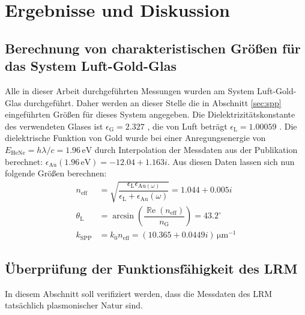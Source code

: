 \documentclass[a4paper, titlepage,  ngerman]{book}
\renewcommand{\Re}{\operatorname{\mathbb{R}e}}
\begin{document}
	\chapter{Ergebnisse und Diskussion}
	\section{Berechnung von charakteristischen Größen für das System Luft-Gold-Glas}
		Alle in dieser Arbeit durchgeführten Messungen wurden am System Luft-Gold-Glas durchgeführt. Daher werden an dieser Stelle die in Abschnitt \ref{sec:spp} eingeführten Größen für dieses System angegeben. Die Dielektrizitätskonstante des verwendeten Glases ist $\epsilon_{\mathrm{G}} = 2.327$ \cite{Zeiss.}, die von Luft beträgt $\epsilon_{\mathrm{L}} = 1.00059$ \cite{Hippel.1995}. Die dielektrische Funktion von Gold wurde bei einer Anregungsenergie von $E_{\mathrm{HeNe}} = h\lambda/c = 1.96\,\mathrm{eV} $ durch Interpolation der Messdaten aus der Publikation \cite{Olmon.2012} berechnet: $\epsilon_{\mathrm{Au}}(1.96\,\mathrm{eV}) = -12.04 +1.163i$. Aus diesen Daten lassen sich nun folgende Größen berechnen:
		\begin{subequations}
			\begin{align}
				n_{\mathrm{eff}} &= \sqrt{\dfrac{\epsilon_{\mathrm{L}}\epsilon_{\mathrm{Au}(\omega)}}{\epsilon_{\mathrm{L}} + 	\epsilon_{\mathrm{Au}}(\omega)}} = 	1.044 + 0.005i \label{eq:theo_n_eff}\\			
				\theta_\mathrm{L} &=  \arcsin\left(\dfrac{\Re(n_{\mathrm{eff}})}{ n_\mathrm{G}}\right) = 43.2^\circ 
				\label{eq:theo_theta_l}\\
				k_{\mathrm{SPP}} &= k_0 n_{\mathrm{eff}} = (10.365 + 0.0449i)\,\mathrm{\mu m}^{-1}\label{eq:theo_k_spp}
			\end{align}
		\end{subequations}
	
	\section{Überprüfung der Funktionsfähigkeit des LRM}
	In diesem Abschnitt soll verifiziert werden, dass die Messdaten des LRM tatsächlich plasmonischer Natur sind.
\end{document}
